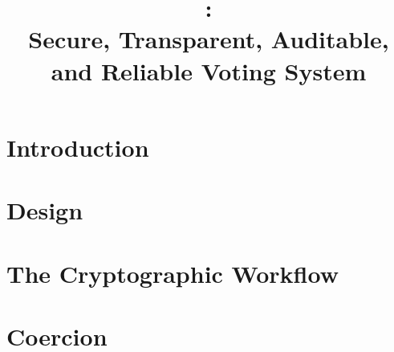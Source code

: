 \documentclass[letterpaper, 10pt, twocolumn]{article}
\title{\projname: \\
Secure, Transparent, Auditable, and Reliable Voting System}
\begin{document}
\maketitle

\begin{abstract}

\end{abstract}

\section{Introduction}


\section{Design}


\section{The Cryptographic Workflow}


\section{Coercion}




\end{document}
